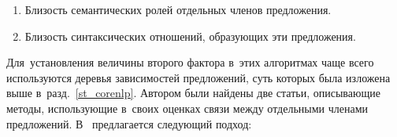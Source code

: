 \begin{enumerate}

\item{
Близость семантических ролей отдельных членов предложения.
}

\item{
Близость синтаксических отношений, образующих эти предложения.
}

\end{enumerate}

Для~установления величины второго фактора в~этих алгоритмах чаще всего используются
деревья зависимостей предложений, суть которых была изложена выше в~разд.~\ref{st_corenlp}.
Автором были найдены две статьи, описывающие методы, 
использующие в~своих оценках связи между отдельными членами предложений.
В~\cite{weightedDep} предлагается следующий подход:

